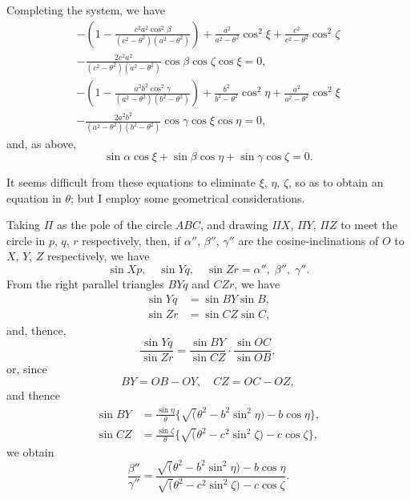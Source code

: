 \documentclass[11pt,a4paper]{article}
\theoremstyle{plain}
\theoremstyle{definition}
\theoremstyle{remark}
\begin{document}
Completing the system, we have
\begin{multline}
-\left(1 - \frac{c^2a^2\cos^2\beta}{(c^2-\theta^2)(a^2-\theta^2)}\right) + \frac{a^2}{a^2-\theta^2}\cos^2\xi + \frac{c^2}{c^2-\theta^2}\cos^2\zeta\\
- \frac{2c^2a^2}{(c^2-\theta^2)(a^2-\theta^2)}\cos\beta\cos\zeta\cos\xi = 0,
\end{multline}
\begin{multline}
-\left(1 - \frac{a^2b^2\cos^2\gamma}{(a^2-\theta^2)(b^2-\theta^2)}\right) + \frac{b^2}{b^2-\theta^2}\cos^2\eta + \frac{a^2}{a^2-\theta^2}\cos^2\xi\\
- \frac{2a^2b^2}{(a^2-\theta^2)(b^2-\theta^2)}\cos\gamma\cos\xi\cos\eta = 0,
\end{multline}
and, as above,
\[
\sin\alpha\cos\xi + \sin\beta\cos\eta + \sin\gamma\cos\zeta = 0.
\]

It seems difficult from these equations to eliminate $\xi$, $\eta$, $\zeta$, so as to obtain an equation in $\theta$; but I employ some geometrical considerations.

Taking $\Pi$ as the pole of the circle $ABC$, and drawing $\Pi X$, $\Pi Y$, $\Pi Z$ to meet the circle in $p$, $q$, $r$ respectively, then, if $\alpha''$, $\beta''$, $\gamma''$ are the cosine-inclinations of $O$ to $X$, $Y$, $Z$ respectively, we have
\[
\sin Xp,\quad \sin Yq,\quad \sin Zr = \alpha'',\; \beta'',\; \gamma''.
\]
From the right parallel triangles $BYq$ and $CZr$, we have
\begin{align*}
\sin Yq &= \sin BY \sin B,\\
\sin Zr &= \sin CZ \sin C,
\end{align*}
and, thence,
\[
\frac{\sin Yq}{\sin Zr} = \frac{\sin BY}{\sin CZ} \cdot \frac{\sin OC}{\sin OB},
\]
or, since
\[
BY = OB - OY,\quad CZ = OC - OZ,
\]
and thence
\begin{align*}
\sin BY &= \frac{\sin\eta}{\theta}\{\surd(\theta^2 - b^2\sin^2\eta) - b\cos\eta\},\\
\sin CZ &= \frac{\sin\zeta}{\theta}\{\surd(\theta^2 - c^2\sin^2\zeta) - c\cos\zeta\},
\end{align*}
we obtain
\[
\frac{\beta''}{\gamma''} = \frac{\surd(\theta^2 - b^2\sin^2\eta) - b\cos\eta}{\surd(\theta^2 - c^2\sin^2\zeta) - c\cos\zeta}.
\]
\end{document}

